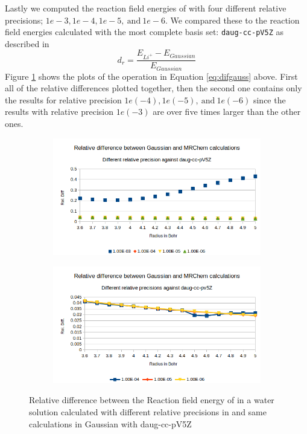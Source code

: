 \documentclass[../master_thesis.tex]{subfiles}
\begin{document}
Lastly we computed the reaction field energies of  with four different
relative precisions; $1e-3, 1e-4, 1e-5,\  \text{and}\  1e-6$. We compared these
to the reaction field energies calculated with the most complete basis set:
\verb!daug-cc-pV5Z! as described in
\begin{equation}\label{eq:difgauss}
    d_r = \frac{E_{Li^+} - E_{Gaussian}}{E_{Gaussian}}
\end{equation}
Figure \ref{fig:lipprecreldef} shows the plots of the operation in Equation \ref{eq:difgauss} above.
First all of the relative differences plotted together, then the second one contains
only the results for relative precision $1e(-4), 1e(-5),\  \text{and}\  1e(-6)$ since
the results with relative precision $1e(-3)$ are over five times larger than the other ones.

\begin{figure}[h!]
  \centering
  \begin{subfigure}[b]{0.75\linewidth}
    \includegraphics[width=\linewidth]{img/lipprecallreldiff.png}
  \end{subfigure}
  \begin{subfigure}[b]{0.75\linewidth}
    \includegraphics[width=\linewidth]{img/lipprecallreldiffexcl.png}
  \end{subfigure}
  \caption{Relative difference between the Reaction field energy of  in a water solution calculated with different relative precisions in \mrchem  and same calculations in Gaussian with daug-cc-pV5Z}
  \label{fig:lipprecreldef}
\end{figure}
\end{document}
